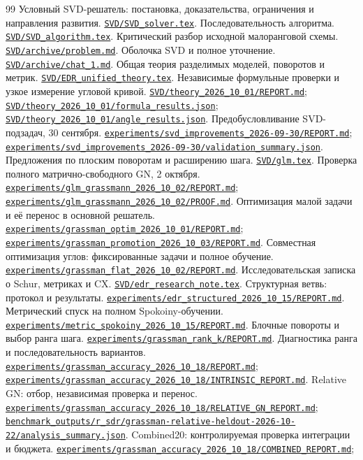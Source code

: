 \documentclass[11pt,a4paper]{article}
\numberwithin{equation}{section}
\newcommand{\repo}[1]{\href{../#1}{\nolinkurl{#1}}}
\begin{document}
\begin{thebibliography}{99}
\small
{} Условный SVD-решатель: постановка, доказательства,
ограничения и направления развития.
\repo{SVD/SVD_solver.tex}.
 Последовательность алгоритма.
\repo{SVD/SVD_algorithm.tex}.
 Критический разбор исходной малоранговой схемы.
\repo{SVD/archive/problem.md}.
 Оболочка SVD и полное уточнение.
\repo{SVD/archive/chat_1.md}.
 Общая теория разделимых моделей, поворотов и метрик.
\repo{SVD/EDR_unified_theory.tex}.
 Независимые формульные проверки и узкое
измерение угловой кривой.
\repo{SVD/theory_2026_10_01/REPORT.md};
\repo{SVD/theory_2026_10_01/formula_results.json};
\repo{SVD/theory_2026_10_01/angle_results.json}.
 Предобусловливание SVD-подзадач, 30 сентября.
\repo{experiments/svd_improvements_2026-09-30/REPORT.md};
\repo{experiments/svd_improvements_2026-09-30/validation_summary.json}.
 Предложения по плоским поворотам и расширению шага.
\repo{SVD/glm.tex}.
 Проверка полного матрично-свободного GN, 2 октября.
\repo{experiments/glm_grassmann_2026_10_02/REPORT.md};
\repo{experiments/glm_grassmann_2026_10_02/PROOF.md}.
 Оптимизация малой задачи и её перенос в основной решатель.
\repo{experiments/grassman_optim_2026_10_01/REPORT.md};
\repo{experiments/grassman_promotion_2026_10_03/REPORT.md}.
 Совместная оптимизация углов: фиксированные задачи
и полное обучение.
\repo{experiments/grassman_flat_2026_10_02/REPORT.md}.
 Исследовательская записка о Schur, метриках и CX.
\repo{SVD/edr_research_note.tex}.
 Структурная ветвь: протокол и результаты.
\repo{experiments/edr_structured_2026_10_15/REPORT.md}.
 Метрический спуск на полном Spokoiny-обучении.
\repo{experiments/metric_spokoiny_2026_10_15/REPORT.md}.
 Блочные повороты и выбор ранга шага.
\repo{experiments/grassman_rank_k/REPORT.md}.
 Диагностика ранга и последовательность вариантов.
\repo{experiments/grassman_accuracy_2026_10_18/REPORT.md};
\repo{experiments/grassman_accuracy_2026_10_18/INTRINSIC_REPORT.md}.
 Relative GN: отбор, независимая проверка и перенос.
\repo{experiments/grassman_accuracy_2026_10_18/RELATIVE_GN_REPORT.md};
\repo{benchmark_outputs/r_sdr/grassman-relative-heldout-2026-10-22/analysis_summary.json}.
 Combined20: контролируемая проверка интеграции и бюджета.
\repo{experiments/grassman_accuracy_2026_10_18/COMBINED_REPORT.md};

\end{thebibliography}
\end{document}
